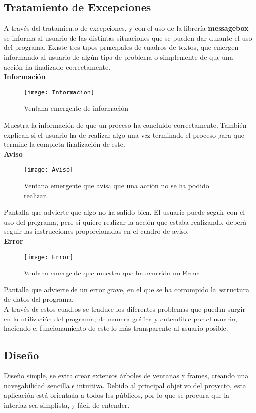 \subsection{Tratamiento de Excepciones}
A través del tratamiento de excepciones, y con el uso de la librería \textbf{messagebox} se informa al usuario de las distintas situaciones que se pueden dar durante el uso del programa. Existe tres tipos principales de cuadros de textos, que emergen informando al usuario de algún tipo de problema o simplemente de que una acción ha finalizado correctamente.\\


\textbf{Información}\\

\begin{figure}[h]
\centering
\texttt{[image: Informacion]} 
\caption{Ventana emergente de información}
\end{figure}
Muestra la información de que un proceso ha concluido correctamente. También explican si el usuario ha de realizar algo una vez terminado el proceso para que termine la completa finalización de este.\\


\textbf{Aviso}\\

\begin{figure}[ht]
\centering
\texttt{[image: Aviso]} 
\caption{Ventana emergente que avisa que una acción no se ha podido realizar.}
\end{figure}
Pantalla que advierte que algo no ha salido bien. El usuario puede seguir con el uso del programa, pero si quiere realizar la acción que estaba realizando, deberá seguir las instrucciones proporcionadas en el cuadro de aviso.\\
\clearpage
\textbf{Error}\\

\begin{figure}[ht]
\centering
\texttt{[image: Error]} 
\caption{Ventana emergente que muestra que ha ocurrido un Error.}
\end{figure}
Pantalla que advierte de un error grave, en el que se ha corrompido la estructura de datos del programa.\\

A través de estos cuadros se traduce los diferentes problemas que puedan surgir en la utilización del programa; de manera gráfica y entendible por el usuario, haciendo el funcionamiento de este lo más transparente al usuario posible.
\subsection{Diseño}
Diseño simple, se evita crear extensos árboles de ventanas y frames, creando una navegabilidad sencilla e intuitiva. Debido al principal objetivo del proyecto,  esta aplicación está orientada a todos los públicos, por lo que se procura que la interfaz sea simplista, y fácil de entender.\\

